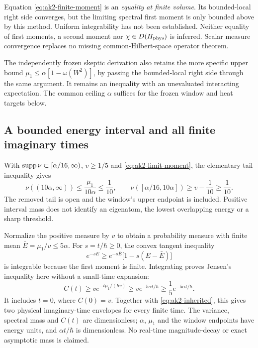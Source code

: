 Equation \eqref{eq:ak2-finite-moment} is an \emph{equality at finite volume}. Its bounded-local right side converges, but the limiting spectral first moment is only bounded above by this method. Uniform integrability has not been established. Neither equality of first moments, a second moment nor $\chi\in D(H_{\rm phys})$ is inferred. Scalar measure convergence replaces no missing common-Hilbert-space operator theorem.

The independently frozen skeptic derivation also retains the more specific upper bound $\mu_1\le\alpha[1-\omega(W^2)]$, by passing the bounded-local right side through the same argument. It remains an inequality with an unevaluated interacting expectation. The common ceiling $\alpha$ suffices for the frozen window and heat targets below.

\subsection{A bounded energy interval and all finite imaginary times}
With $\operatorname{supp}\nu\subset[\alpha/16,\infty)$, $v\ge1/5$ and \eqref{eq:ak2-limit-moment}, the elementary tail inequality gives
\begin{equation}
 \nu((10\alpha,\infty))\le\frac{\mu_1}{10\alpha}\le\frac1{10},
 \qquad
 \nu([\alpha/16,10\alpha])\ge v-\frac1{10}\ge\frac1{10}.
 \label{eq:ak2-window}
\end{equation}
The removed tail is open and the window's upper endpoint is included. Positive interval mass does not identify an eigenatom, the lowest overlapping energy or a sharp threshold.

Normalize the positive measure by $v$ to obtain a probability measure with finite mean $\bar E=\mu_1/v\le5\alpha$. For $s=t/\hbar\ge0$, the convex tangent inequality
\begin{equation}
 e^{-sE}\ge e^{-s\bar E}\bigl[1-s(E-\bar E)\bigr]
\end{equation}
is integrable because the first moment is finite. Integrating proves Jensen's inequality here without a small-time expansion:
\begin{equation}
 C(t)\ge v e^{-t\mu_1/(\hbar v)}
       \ge v e^{-5\alpha t/\hbar}
       \ge\frac15e^{-5\alpha t/\hbar}.
 \label{eq:ak2-jensen}
\end{equation}
It includes $t=0$, where $C(0)=v$. Together with \eqref{eq:ak2-inherited}, this gives two physical imaginary-time envelopes for every finite time. The variance, spectral mass and $C(t)$ are dimensionless; $\alpha$, $\mu_1$ and the window endpoints have energy units, and $\alpha t/\hbar$ is dimensionless. No real-time magnitude-decay or exact asymptotic mass is claimed.

